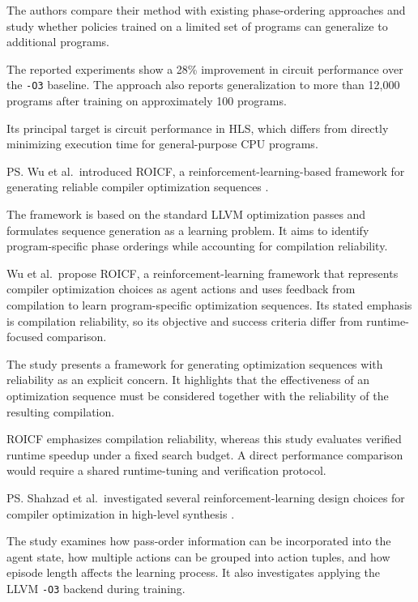 The authors compare their method with existing phase-ordering approaches and study whether policies trained on a limited set of programs can generalize to additional programs.

\re{} The reported experiments show a 28\% improvement in circuit performance over the \texttt{-O3} baseline. The approach also reports generalization to more than 12,000 programs after training on approximately 100 programs.

\rg{} Its principal target is circuit performance in HLS, which differs from directly minimizing execution time for general-purpose CPU programs.

\ps{} Wu et al.\ introduced ROICF, a reinforcement-learning-based framework for generating reliable compiler optimization sequences \cite{wu2020roicf}.

\me{} The framework is based on the standard LLVM optimization passes and formulates sequence generation as a learning problem. It aims to identify program-specific phase orderings while accounting for compilation reliability.

Wu et al.\ propose ROICF, a reinforcement-learning framework that represents compiler optimization choices as agent actions and uses feedback from compilation to learn program-specific optimization sequences. Its stated emphasis is compilation reliability, so its objective and success criteria differ from runtime-focused comparison.

\re{} The study presents a framework for generating optimization sequences with reliability as an explicit concern. It highlights that the effectiveness of an optimization sequence must be considered together with the reliability of the resulting compilation.

\rg{} ROICF emphasizes compilation reliability, whereas this study evaluates verified runtime speedup under a fixed search budget. A direct performance comparison would require a shared runtime-tuning and verification protocol.

\ps{} Shahzad et al.\ investigated several reinforcement-learning design choices for compiler optimization in high-level synthesis \cite{shahzad2022rl}.

\me{} The study examines how pass-order information can be incorporated into the agent state, how multiple actions can be grouped into action tuples, and how episode length affects the learning process. It also investigates applying the LLVM \texttt{-O3} backend during training.

